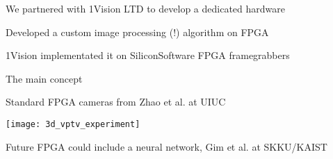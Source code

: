 \begin{frame}[label=real-9]{We partnered with 1Vision LTD to develop a dedicated hardware}
    \centering{}
\end{frame}


\begin{frame}[label=real-10]{Developed a custom image processing (!) algorithm on FPGA}
    \centering{}
    \end{frame}

    \begin{frame}[label=real-11]{1Vision implementated it on SiliconSoftware FPGA framegrabbers}
\end{frame}

\begin{frame}[label=real-12]{The main concept}
    \centering{}
\end{frame}


\begin{frame}[label=real-7c]{Standard FPGA cameras from Zhao et al. at UIUC}
    \begin{card}
    \centering
    \texttt{[image: 3d\_vptv\_experiment]}
    \end{card}
\end{frame}


\begin{frame}[label=real-7d]{Future FPGA could include a neural network, Gim et al. at SKKU/KAIST}
    \centering {}
\end{frame}



%
